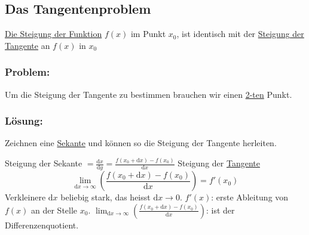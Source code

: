 \documentclass[11pt]{amsart}
\theoremstyle{remark}
\begin{document}
\subsection{Das Tangentenproblem}
\begin{figure}[h]
  \centering
 \end{figure}
\underline{Die Steigung der Funktion} $f(x)$ im Punkt $x_0$, ist identisch mit der \underline{Steigung der Tangente} an $f(x)$ in $x_0$
\subsubsection*{Problem:}
Um die Steigung der Tangente zu bestimmen brauchen wir einen \underline{2-ten} Punkt.
\subsubsection*{L\"osung:}
Zeichnen eine \underline{Sekante} und k\"onnen so die Steigung der Tangente herleiten.
\begin{figure}[h]
  \centering
 \end{figure}
Steigung der Sekante $= \frac {\mathrm dx}{\mathrm dy}=\frac {f(x_0 + \mathrm dx ) - f(x_0)}{\mathrm dx}$\newline
Steigung der \underline{Tangente}
\begin{equation*}
	\lim_{\mathrm dx \to \infty} \left( \frac {f(x_0 + \mathrm dx) - f(x_0)}{\mathrm dx} \right) = f'(x_0)
\end{equation*}
Verkleinere $\mathrm dx$ beliebig stark, das heisst $\mathrm dx \to 0$. \newline
$f'(x)$: erste Ableitung von $f(x)$ an der Stelle $x_0$.\newline
$\lim_{\mathrm dx \to \infty} \left( \frac {f(x_0 + \mathrm dx) - f(x_0)}{\mathrm dx} \right)$: ist der Differenzenquotient.
\end{document}
